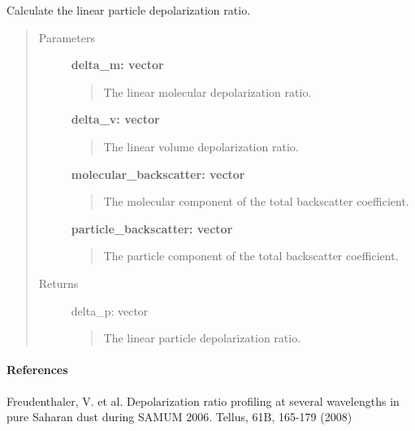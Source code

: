 \documentclass[letterpaper,10pt,english]{sphinxmanual}
\begin{document}

\begin{fulllineitems}
\label{depolarization:depolarization.particle_depolarization}
Calculate the linear particle depolarization ratio.
\begin{quote}\begin{description}
\item[{Parameters}] \leavevmode
\textbf{delta\_m: vector}
\begin{quote}

The linear molecular depolarization ratio.
\end{quote}

\textbf{delta\_v: vector}
\begin{quote}

The linear volume depolarization ratio.
\end{quote}

\textbf{molecular\_backscatter: vector}
\begin{quote}

The molecular component of the total backscatter coefficient.
\end{quote}

\textbf{particle\_backscatter: vector}
\begin{quote}

The particle component of the total backscatter coefficient.
\end{quote}

\item[{Returns}] \leavevmode
delta\_p: vector
\begin{quote}

The linear particle depolarization ratio.
\end{quote}

\end{description}\end{quote}
\paragraph{References}

Freudenthaler, V. et al. Depolarization ratio profiling at several wavelengths in pure
Saharan dust during SAMUM 2006. Tellus, 61B, 165-179 (2008)

\end{fulllineitems}
\end{document}
